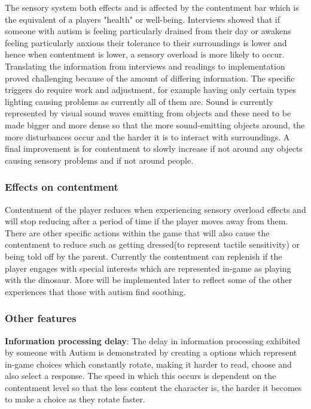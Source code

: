 \documentclass[11pt]{report}
\begin{document}
The sensory system both effects and is affected by the contentment bar which is the equivalent of a players "health" or well-being. Interviews showed that if someone with autism is feeling particularly drained from their day or
awakens feeling particularly anxious their tolerance to their surroundings is lower and hence when contentment is lower, a sensory overload is more likely to occur. Translating the information from interviews and readings to
implementation proved challenging because of the amount of differing information. The specific triggers do require work and adjustment, for example having only certain types lighting causing problems as currently all of them
are. Sound is currently represented by visual sound waves emitting from objects and these need to be made bigger and more dense so that the more sound-emitting objects around, the more disturbances occur and the harder
it is to interact with surroundings. A final improvement is for contentment to slowly increase if not around any objects causing sensory problems and if not around people.


\subsubsection{Effects on contentment}
Contentment of the player reduces when experiencing sensory overload effects and will stop reducing after a period of time if the player moves away from them. There are other specific actions within the game that will also cause the
contentment to reduce such as getting dressed(to represent tactile sensitivity) or being told off by the parent. Currently the contentment can replenish if the player engages with special interests which are represented in-game as playing with the dinosaur. More will be implemented later to reflect some of the other experiences that those with autism find soothing.

\subsubsection{Other features}
\textbf{Information processing delay}: The delay in information processing exhibited by someone with Autism is demonstrated by creating a options which represent in-game choices which constantly rotate, making it harder
to read, choose and also select a response. The speed in which this occurs is dependent on the contentment level so that the less content the character is, the harder it becomes to make a choice as they rotate faster. \\
\end{document}
